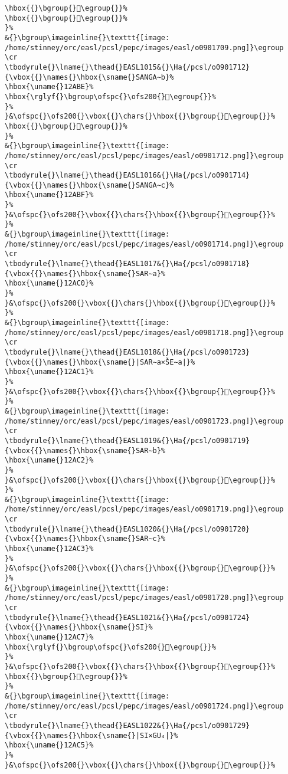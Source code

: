\begin{verbatim}
\hbox{{}\bgroup{}𒪻\egroup{}}%
\hbox{{}\bgroup{}𒪼\egroup{}}%
}%
&{}\bgroup\imageinline{}\texttt{[image: /home/stinney/orc/easl/pcsl/pepc/images/easl/o0901709.png]}\egroup
\cr
\tbodyrule{}\lname{}\thead{}EASL1015&{}\Ha{/pcsl/o0901712}{\vbox{{}\names{}\hbox{\sname{}SANGA∼b}%
\hbox{\uname{}12ABE}%
\hbox{\rglyf{}\bgroup\ofspc{}\ofs200{}𒪾\egroup{}}%
}%
}&\ofspc{}\ofs200{}\vbox{{}\chars{}\hbox{{}\bgroup{}𒪽\egroup{}}%
\hbox{{}\bgroup{}𒪾\egroup{}}%
}%
&{}\bgroup\imageinline{}\texttt{[image: /home/stinney/orc/easl/pcsl/pepc/images/easl/o0901712.png]}\egroup
\cr
\tbodyrule{}\lname{}\thead{}EASL1016&{}\Ha{/pcsl/o0901714}{\vbox{{}\names{}\hbox{\sname{}SANGA∼c}%
\hbox{\uname{}12ABF}%
}%
}&\ofspc{}\ofs200{}\vbox{{}\chars{}\hbox{{}\bgroup{}𒪿\egroup{}}%
}%
&{}\bgroup\imageinline{}\texttt{[image: /home/stinney/orc/easl/pcsl/pepc/images/easl/o0901714.png]}\egroup
\cr
\tbodyrule{}\lname{}\thead{}EASL1017&{}\Ha{/pcsl/o0901718}{\vbox{{}\names{}\hbox{\sname{}SAR∼a}%
\hbox{\uname{}12AC0}%
}%
}&\ofspc{}\ofs200{}\vbox{{}\chars{}\hbox{{}\bgroup{}𒫀\egroup{}}%
}%
&{}\bgroup\imageinline{}\texttt{[image: /home/stinney/orc/easl/pcsl/pepc/images/easl/o0901718.png]}\egroup
\cr
\tbodyrule{}\lname{}\thead{}EASL1018&{}\Ha{/pcsl/o0901723}{\vbox{{}\names{}\hbox{\sname{}|SAR∼a×ŠE∼a|}%
\hbox{\uname{}12AC1}%
}%
}&\ofspc{}\ofs200{}\vbox{{}\chars{}\hbox{{}\bgroup{}𒫁\egroup{}}%
}%
&{}\bgroup\imageinline{}\texttt{[image: /home/stinney/orc/easl/pcsl/pepc/images/easl/o0901723.png]}\egroup
\cr
\tbodyrule{}\lname{}\thead{}EASL1019&{}\Ha{/pcsl/o0901719}{\vbox{{}\names{}\hbox{\sname{}SAR∼b}%
\hbox{\uname{}12AC2}%
}%
}&\ofspc{}\ofs200{}\vbox{{}\chars{}\hbox{{}\bgroup{}𒫂\egroup{}}%
}%
&{}\bgroup\imageinline{}\texttt{[image: /home/stinney/orc/easl/pcsl/pepc/images/easl/o0901719.png]}\egroup
\cr
\tbodyrule{}\lname{}\thead{}EASL1020&{}\Ha{/pcsl/o0901720}{\vbox{{}\names{}\hbox{\sname{}SAR∼c}%
\hbox{\uname{}12AC3}%
}%
}&\ofspc{}\ofs200{}\vbox{{}\chars{}\hbox{{}\bgroup{}𒫃\egroup{}}%
}%
&{}\bgroup\imageinline{}\texttt{[image: /home/stinney/orc/easl/pcsl/pepc/images/easl/o0901720.png]}\egroup
\cr
\tbodyrule{}\lname{}\thead{}EASL1021&{}\Ha{/pcsl/o0901724}{\vbox{{}\names{}\hbox{\sname{}SI}%
\hbox{\uname{}12AC7}%
\hbox{\rglyf{}\bgroup\ofspc{}\ofs200{}𒫇\egroup{}}%
}%
}&\ofspc{}\ofs200{}\vbox{{}\chars{}\hbox{{}\bgroup{}𒫄\egroup{}}%
\hbox{{}\bgroup{}𒫇\egroup{}}%
}%
&{}\bgroup\imageinline{}\texttt{[image: /home/stinney/orc/easl/pcsl/pepc/images/easl/o0901724.png]}\egroup
\cr
\tbodyrule{}\lname{}\thead{}EASL1022&{}\Ha{/pcsl/o0901729}{\vbox{{}\names{}\hbox{\sname{}|SI×GU₄|}%
\hbox{\uname{}12AC5}%
}%
}&\ofspc{}\ofs200{}\vbox{{}\chars{}\hbox{{}\bgroup{}𒫅\egroup{}}%

\end{verbatim}
